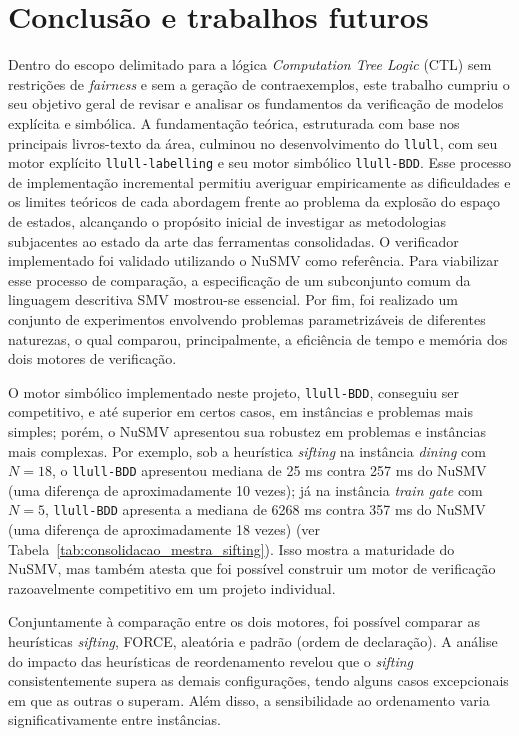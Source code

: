 \documentclass[cic,tc]{infufrgs}
\begin{document}
	\FloatBarrier
	
	\chapter{Conclusão e trabalhos futuros}
	\label{ch:conclusao}
	Dentro do escopo delimitado para a lógica \textit{Computation Tree Logic} (CTL) sem restrições de \textit{fairness} e sem a geração de contraexemplos, este trabalho cumpriu o seu objetivo geral de revisar e analisar os fundamentos da verificação de modelos explícita e simbólica. 
	A fundamentação teórica, estruturada com base nos principais livros-texto da área, culminou no desenvolvimento do \texttt{llull}, com seu motor explícito \texttt{llull-labelling} e seu motor simbólico \texttt{llull-BDD}. 
	Esse processo de implementação incremental permitiu averiguar empiricamente as dificuldades e os limites teóricos de cada abordagem frente ao problema da explosão do espaço de estados, alcançando o propósito inicial de investigar as metodologias subjacentes ao estado da arte das ferramentas consolidadas. O verificador implementado foi validado utilizando o NuSMV como referência. Para viabilizar esse processo de comparação, a especificação de um subconjunto comum da linguagem descritiva SMV mostrou-se essencial. Por fim, foi realizado um conjunto de experimentos envolvendo problemas parametrizáveis de diferentes naturezas, o qual comparou, principalmente, a eficiência de tempo e memória dos dois motores de verificação. 
	
	O motor simbólico implementado neste projeto, \texttt{llull-BDD}, conseguiu ser competitivo, e até superior em certos casos, em instâncias e problemas mais simples; porém, o NuSMV apresentou sua robustez em problemas e instâncias mais complexas. Por exemplo, sob a heurística \textit{sifting} na instância \textit{dining} com $N=18$, o \texttt{llull-BDD} apresentou mediana de 25 ms contra 257 ms do NuSMV (uma diferença de aproximadamente 10 vezes); já na instância \textit{train gate} com $N=5$, \texttt{llull-BDD} apresenta a mediana de 6268 ms contra 357 ms do NuSMV (uma diferença de aproximadamente 18 vezes) (ver Tabela~\ref{tab:consolidacao_mestra_sifting}). Isso mostra a maturidade do NuSMV, mas também atesta que foi possível construir um motor de verificação razoavelmente competitivo em um projeto individual.
	
	Conjuntamente à comparação entre os dois motores, foi possível comparar as heurísticas \textit{sifting}, FORCE, aleatória e padrão (ordem de declaração).
	A análise do impacto das heurísticas de reordenamento revelou que o \textit{sifting} consistentemente supera as demais configurações, tendo alguns casos excepcionais em que as outras o superam. Além disso, a sensibilidade ao ordenamento varia significativamente entre instâncias.
	
\end{document}
